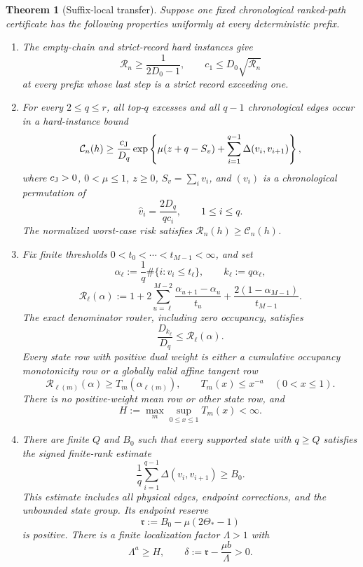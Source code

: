 \documentclass[11pt]{article}
\newtheorem{theorem}{Theorem}[section]
\theoremstyle{remark}
\newcommand{\Risk}{\mathcal R}
\begin{document}
\begin{theorem}[Suffix-local transfer]
\label{thm:compiler}
Suppose one fixed chronological ranked-path certificate has the following
properties uniformly at every deterministic prefix.

\begin{enumerate}
\item The empty-chain and strict-record hard instances give
\begin{equation}
 \Risk_n\ge\frac1{2D_0-1},
 \qquad
 c_1\le D_0\sqrt{\Risk_n}
 \label{eq:record-arms}
\end{equation}
at every prefix whose last step is a strict record exceeding one.

\item For every \(2\le q\le r\), all top-\(q\) excesses and all
\(q-1\) chronological edges occur in a hard-instance bound
\begin{equation}
 \mathcal C_n(h)\ge\frac{c_{\rm J}}{D_q}
 \exp\left\{\mu(z+q-S_v)
 +\sum_{i=1}^{q-1}\Delta(v_i,v_{i+1})\right\},
 \label{eq:chronological-path}
\end{equation}
where \(c_{\rm J}>0\), \(0<\mu\le1\), \(z\ge0\),
\(S_v=\sum_i v_i\), and \((v_i)\) is a chronological permutation of
\[
 \widehat v_i=\frac{2D_q}{qc_i},\qquad 1\le i\le q.
\]
The normalized worst-case risk satisfies \(\Risk_n(h)\ge\mathcal C_n(h)\).

\item Fix finite thresholds \(0<t_0<\cdots<t_{M-1}<\infty\), and set
\[
 \alpha_\ell:=\frac1q\#\{i:v_i\le t_\ell\},\qquad
 k_\ell:=q\alpha_\ell,
\]
\[
 \mathscr R_\ell(\alpha):=1+
 2\sum_{u=\ell}^{M-2}\frac{\alpha_{u+1}-\alpha_u}{t_u}
 +\frac{2(1-\alpha_{M-1})}{t_{M-1}}.
\]
The exact denominator router, including zero occupancy, satisfies
\[
 \frac{D_{k_\ell}}{D_q}\le\mathscr R_\ell(\alpha).
\]
Every state row with positive dual weight is either a cumulative occupancy
monotonicity row or a globally valid affine tangent row
\[
 \mathscr R_{\ell(m)}(\alpha)\ge T_m(\alpha_{\ell(m)}),
 \qquad T_m(x)\le x^{-a}\quad(0<x\le1).
\]
There is no positive-weight mean row or other state row, and
\[
 H:=\max_m\sup_{0\le x\le1}T_m(x)<\infty.
\]

\item There are finite \(Q\) and \(B_0\) such that every supported state
with \(q\ge Q\) satisfies the signed finite-rank estimate
\[
 \frac1q\sum_{i=1}^{q-1}\Delta(v_i,v_{i+1})\ge B_0.
\]
This estimate includes all physical edges, endpoint corrections, and the
unbounded state group.  Its endpoint reserve
\[
 \mathfrak r:=B_0-\mu(2\Theta_*-1)
\]
is positive.  There is a finite localization factor \(\Lambda>1\) with
\begin{equation}
 \Lambda^a\ge H,
 \qquad
 \delta:=\mathfrak r-\frac{\mu b}{\Lambda}>0.
 \label{eq:localization-reserve}
\end{equation}
\end{enumerate}


\end{theorem}
\end{document}

